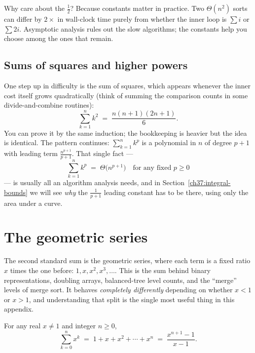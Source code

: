 \begin{aestheticbox}
Why care about the $\tfrac12$? Because constants matter in practice. Two
$\Theta(n^2)$ sorts can differ by $2\times$ in wall-clock time purely from
whether the inner loop is $\sum i$ or $\sum 2i$. Asymptotic analysis rules out
the slow algorithms; the constants help you choose among the ones that remain.
\end{aestheticbox}

\subsection{Sums of squares and higher powers}
\label{ch37:squares}

One step up in difficulty is the sum of squares, which appears whenever the inner
cost itself grows quadratically (think of summing the comparison counts in some
divide-and-combine routines):
\[
  \sum_{k=1}^{n} k^2 \;=\; \frac{n(n+1)(2n+1)}{6}.
\]
You can prove it by the same induction; the bookkeeping is heavier but the idea is
identical. The pattern continues: $\sum_{k=1}^{n} k^p$ is a polynomial in $n$ of
degree $p+1$ with leading term $\tfrac{n^{p+1}}{p+1}$. That single fact ---
\[
  \sum_{k=1}^{n} k^p \;=\; \Theta\!\bigl(n^{p+1}\bigr)\quad\text{for any fixed } p \ge 0
\]
--- is usually all an algorithm analysis needs, and in
Section~\ref{ch37:integral-bounds} we will see \emph{why} the $\tfrac{1}{p+1}$ leading
constant has to be there, using only the area under a curve.

\section{The geometric series}
\label{ch37:geometric}

The second standard sum is the geometric series, where each term is a fixed ratio $x$
times the one before: $1, x, x^2, x^3, \dots$. This is the sum behind binary
representations, doubling arrays, balanced-tree level counts, and the
``merge'' levels of merge sort. It behaves \emph{completely differently}
depending on whether $x<1$ or $x>1$, and understanding that split is the single
most useful thing in this appendix.

\begin{theorem}
\label{ch37:thm-geo}
For any real $x \neq 1$ and integer $n \ge 0$,
\[
  \sum_{k=0}^{n} x^k \;=\; 1 + x + x^2 + \cdots + x^n \;=\; \frac{x^{n+1} - 1}{x - 1}.
\]
\end{theorem}

